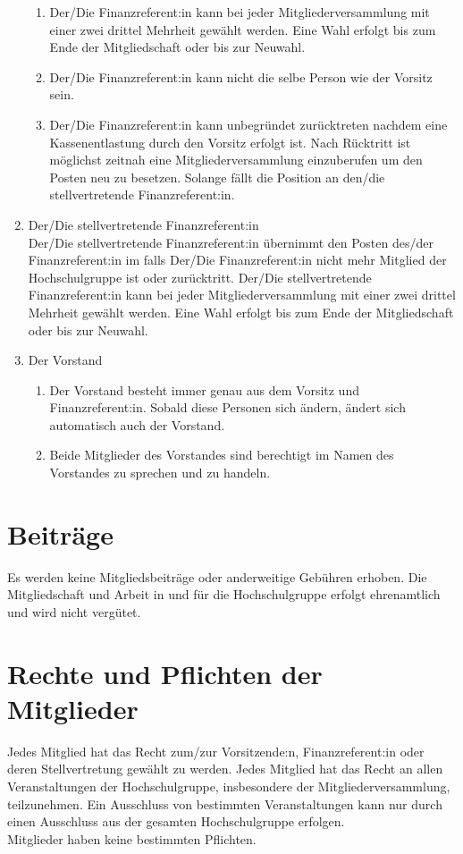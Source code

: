 \documentclass[11pt]{article}
\begin{document}
\begin{enumerate}
\begin{enumerate}
			\item Der/Die Finanzreferent:in kann bei jeder Mitgliederversammlung mit einer zwei drittel Mehrheit gewählt werden. Eine Wahl erfolgt bis zum Ende der Mitgliedschaft oder bis zur Neuwahl.
			\item Der/Die Finanzreferent:in kann nicht die selbe Person wie der Vorsitz sein.
			\item Der/Die Finanzreferent:in kann unbegründet zurücktreten nachdem eine Kassenentlastung durch den Vorsitz erfolgt ist. Nach Rücktritt ist möglichst zeitnah eine Mitgliederversammlung einzuberufen um den Posten neu zu besetzen. Solange fällt die Position an den/die stellvertretende Finanzreferent:in.
		\end{enumerate}
		\item Der/Die stellvertretende Finanzreferent:in\\
		Der/Die stellvertretende Finanzreferent:in übernimmt den Posten des/der Finanzreferent:in im falls Der/Die Finanzreferent:in nicht mehr Mitglied der Hochschulgruppe ist oder zurücktritt. Der/Die stellvertretende Finanzreferent:in kann bei jeder Mitgliederversammlung mit einer zwei drittel Mehrheit gewählt werden. Eine Wahl erfolgt bis zum Ende der Mitgliedschaft oder bis zur Neuwahl.
		\item Der Vorstand
		\begin{enumerate}
			\item Der Vorstand besteht immer genau aus dem Vorsitz und Finanzreferent:in. Sobald diese Personen sich ändern, ändert sich automatisch auch der Vorstand.
			\item Beide Mitglieder des Vorstandes sind berechtigt im Namen des Vorstandes zu sprechen und zu handeln.
		\end{enumerate}
	\end{enumerate}
\section{Beiträge}
Es werden keine Mitgliedsbeiträge oder anderweitige Gebühren erhoben. Die Mitgliedschaft und Arbeit in und für die Hochschulgruppe erfolgt ehrenamtlich und wird nicht vergütet.
\section{Rechte und Pflichten der Mitglieder}
Jedes Mitglied hat das Recht zum/zur Vorsitzende:n, Finanzreferent:in oder deren Stellvertretung gewählt zu werden. Jedes Mitglied hat das Recht an allen Veranstaltungen der Hochschulgruppe, insbesondere der Mitgliederversammlung, teilzunehmen. Ein Ausschluss von bestimmten Veranstaltungen kann nur durch einen Ausschluss aus der gesamten Hochschulgruppe erfolgen.\\
Mitglieder haben keine bestimmten Pflichten.
\end{document}
